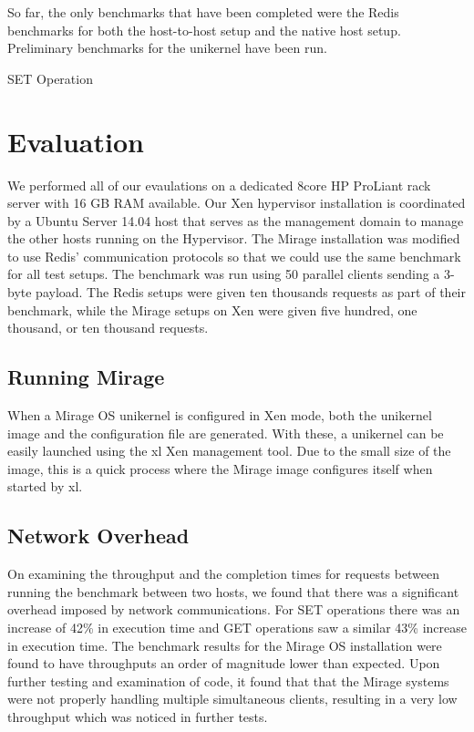 \documentclass[english,10pt,twocolumn]{article}
\begin{document}
So far, the only benchmarks that have been completed were the Redis benchmarks for both the host-to-host setup and the native host setup. Preliminary benchmarks for the unikernel have been run.

SET Operation




\section{Evaluation}

We performed all of our evaulations on a dedicated 8\-core HP ProLiant rack server with 16 GB RAM available.
Our Xen hypervisor installation is coordinated by a Ubuntu Server 14.04 host that serves as the management domain to manage the other hosts running on the Hypervisor.
The Mirage installation was modified to use Redis' communication protocols so that we could use the same benchmark for all test setups. The benchmark was run using 50 parallel clients sending a 3-byte payload. 
The Redis setups were given ten thousands requests as part of their benchmark, while the Mirage setups on Xen were given five hundred, one thousand, or ten thousand requests.


\subsection{Running Mirage}

When a Mirage OS unikernel is configured in Xen mode, both the unikernel image and the configuration file are generated.
With these, a unikernel can be easily launched using the xl Xen management tool.
Due to the small size of the image, this is a quick process where the Mirage image configures itself when started by xl.

\subsection{Network Overhead}

On examining the throughput and the completion times for requests between running the benchmark between two hosts, we found that there was a significant overhead imposed by network communications. For SET operations there was an increase of 42\% in execution time and GET operations saw a similar 43\% increase in execution time.
The benchmark results for the Mirage OS installation were found to have throughputs an order of magnitude lower than expected. 
Upon further testing and examination of code, it found that that the Mirage systems were not properly handling multiple simultaneous clients, resulting in a very low throughput which was noticed in further tests.
\end{document}
